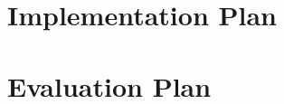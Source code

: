 \documentclass[12pt]{article}
\numberwithin{equation}{section}
\begin{document}
\newpage
\thispagestyle{plain}
\mbox{}
\section {Implementation Plan}
\label{sec:implementationPlan}


\newpage
\thispagestyle{plain}
\mbox{}
\section {Evaluation Plan}
\label{sec:evaluationPlan}


\newpage
\thispagestyle{plain}
\mbox{}



\end{document}
